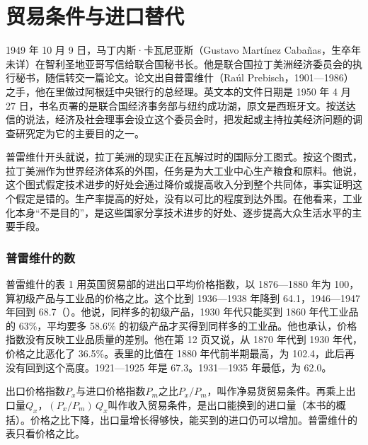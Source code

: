 \section{贸易条件与进口替代}\label{sec:development-isi}

1949 年 10 月 9 日，马丁内斯·卡瓦尼亚斯（Gustavo Martínez Cabañas，生卒年未详）在智利圣地亚哥写信给联合国秘书长\cite{prebisch1950}。他是联合国拉丁美洲经济委员会的执行秘书，随信转交一篇论文\cite{prebisch1950}。论文出自普雷维什（Raúl Prebisch，1901—1986）之手\cite{prebisch1950,bnf29}，他在里做过阿根廷中央银行的总经理。英文本的文件日期是 1950 年 4 月 27 日，书名页署的是联合国经济事务部与纽约成功湖，原文是西班牙文\cite{prebisch1950}。按送达信的说法，经济及社会理事会设立这个委员会时，把发起或主持拉美经济问题的调查研究定为它的主要目的之一\cite{prebisch1950}。

普雷维什开头就说，拉丁美洲的现实正在瓦解过时的国际分工图式\cite{prebisch1950}。按这个图式，拉丁美洲作为世界经济体系的外围，任务是为大工业中心生产粮食和原料。他说，这个图式假定技术进步的好处会通过降价或提高收入分到整个共同体，事实证明这个假定是错的\cite{prebisch1950}。生产率提高的好处，没有以可比的程度到达外围。在他看来，工业化本身“不是目的”，是这些国家分享技术进步的好处、逐步提高大众生活水平的主要手段\cite{prebisch1950}。

\subsubsection{普雷维什的数}

普雷维什的表 1 用英国贸易部的进出口平均价格指数，以 1876—1880 年为 100，算初级产品与工业品的价格之比\cite{prebisch1950}。这个比到 1936—1938 年降到 64.1，1946—1947 年回到 68.7（）\cite{prebisch1950}。他说，同样多的初级产品，1930 年代只能买到 1860 年代工业品的 63\%，平均要多 58.6\% 的初级产品才买得到同样多的工业品\cite{prebisch1950}。他也承认，价格指数没有反映工业品质量的差别\cite{prebisch1950}。他在第 12 页又说，从 1870 年代到 1930 年代，价格之比恶化了 36.5\%\cite{prebisch1950}。表里的比值在 1880 年代前半期最高，为 102.4，此后再没有回到这个高度。1921—1925 年是 67.3。1931—1935 年最低，为 62.0\cite{prebisch1950}。

出口价格指数$P_x$与进口价格指数$P_m$之比$P_x/P_m$，叫作净易货贸易条件。再乘上出口量$Q_x$，$(P_x/P_m)\,Q_x$叫作收入贸易条件，是出口能换到的进口量（本书的概括）。价格之比下降，出口量增长得够快，能买到的进口仍可以增加。普雷维什的表只看价格之比。

